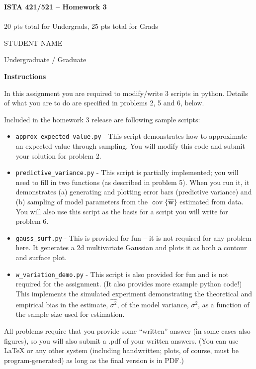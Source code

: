 \documentclass[10pt]{article}
\newcommand{\latex}{\LaTeX\xspace}
\DeclareMathOperator{\cov}{\texttt cov}
\begin{document}
\begin{center}
    {\Large {\bf ISTA 421/521 -- Homework 3}} \\
     \\
    20 pts total for Undergrads, 25 pts total for Grads
    
\end{center}

\begin{flushright}
STUDENT NAME %

Undergraduate / Graduate %
\end{flushright}

\vspace{1cm}
{\Large {\bf Instructions}}

In this assignment you are required to modify/write 3 scripts in python.  Details of what you are to do are specified in problems 2, 5 and 6, below.

Included in the homework 3 release are following sample scripts:
\begin{itemize}
\item {\tt approx\_expected\_value.py} - This script demonstrates how to approximate an expected value through sampling.  You will modify this code and submit your solution for problem 2.
\item {\tt predictive\_variance.py} - This script is partially implemented; you will need to fill in two functions (as described in problem 5).  When you run it, it demonstrates (a) generating and plotting error bars (predictive variance) and (b) sampling of model parameters from the $\cov\{\widehat{\mathbf{w}}\}$ estimated from data.  You will also use this script as the basis for a script you will write for problem 6.
\item {\tt gauss\_surf.py} - This is provided for fun -- it is not required for any problem here.  It generates a 2d multivariate Gaussian and plots it as both a contour and surface plot.
\item {\tt w\_variation\_demo.py} - This script is also provided for fun and is not required for the assignment. (It also provides more example python code!)  This implements the simulated experiment demonstrating the theoretical and empirical bias in the estimate, $\widehat{\sigma^2}$, of the model variance, $\sigma^2$, as a function of the sample size used for estimation.
\end{itemize}

All problems require that you provide some ``written'' answer (in some cases also figures), so you will also submit a .pdf of your written answers.  (You can use \latex or any other system (including handwritten; plots, of course, must be program-generated) as long as the final version is in PDF.)
\end{document}
